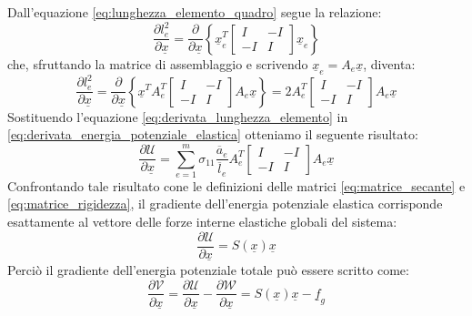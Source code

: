 Dall'equazione \ref{eq:lunghezza_elemento_quadro} segue la relazione: 
\begin{equation}
   \frac{\partial l_e^2}{\partial{\underline{x}}} = \frac{\partial}{\partial{\underline{x}}} \left\{ \underline{x}_e^T 
   \begin{bmatrix}
    I & -I \\
    -I &  I 
   \end{bmatrix} \underline{x}_e \right\}
\end{equation}
che, sfruttando la matrice di assemblaggio e scrivendo $\underline{x}_e = A_e \underline{x}$, diventa: 
\begin{equation}
   \frac{\partial l_e^2}{\partial{\underline{x}}} = \frac{\partial}{\partial{\underline{x}}} \left\{ \underline{x}^T A_e^T
   \begin{bmatrix}
    I & -I \\
    -I &  I 
   \end{bmatrix} A_e \underline{x} \right\} = 2 A_e^T \begin{bmatrix}
    I & -I \\
    -I &  I 
   \end{bmatrix} 
   A_e \underline{x}
   \label{eq:derivata_lunghezza_elemento}
\end{equation}
Sostituendo l'equazione \eqref{eq:derivata_lunghezza_elemento} in \eqref{eq:derivata_energia_potenziale_elastica} otteniamo il seguente risultato: 
\begin{equation}
   \frac{\partial {\mathcal{U}}}{\partial {\underline{x}}} = \sum_{e=1}^{m} \sigma_{11} \frac{\overline{a}_e}{\overline{l}_e} A_e^T \begin{bmatrix}
    I & -I \\
    -I &  I 
   \end{bmatrix} 
   A_e \underline{x}
\end{equation}
Confrontando tale risultato cone le definizioni delle matrici \eqref{eq:matrice_secante} e \eqref{eq:matrice_rigidezza}, il gradiente dell'energia potenziale elastica corrisponde esattamente al vettore delle forze interne elastiche globali del sistema: 
\begin{equation}
   \frac{\partial {\mathcal{U}}}{\partial {\underline{x}}} = S (\underline{x}) \underline{x}
   \label{eq:potenziale_elastica}
\end{equation}
Perciò il gradiente dell'energia potenziale totale può essere scritto come:
\begin{equation}
   \frac{\partial \mathcal{V}}{\partial \underline{x}} = \frac{\partial {\mathcal{U}}}{\partial {\underline{x}}} - \frac{\partial \mathcal{W}}{\partial \underline{x}}  = S (\underline{x}) \underline{x} - \underline{f}_g
\end{equation}


